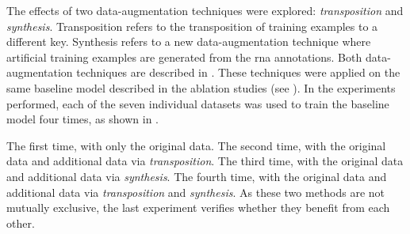 
The effects of two data-augmentation techniques were
explored: \emph{transposition} and \emph{synthesis}.
Transposition refers to the transposition of training
examples to a different key. Synthesis refers to a new
data-augmentation technique where artificial training
examples are generated from the \gls{rna} annotations. Both
data-augmentation techniques are described in
. These techniques were applied on
the same baseline model described in the ablation studies
(see ). In the experiments
performed, each of the seven individual datasets was used to
train the baseline model four times, as shown in
. 


The first time, with only the original data. The second
time, with the original data and additional data via
\emph{transposition}. The third time, with the original data
and additional data via \emph{synthesis}. The fourth time,
with the original data and additional data via
\emph{transposition} and \emph{synthesis}. As these two
methods are not mutually exclusive, the last experiment
verifies whether they benefit from each other.
